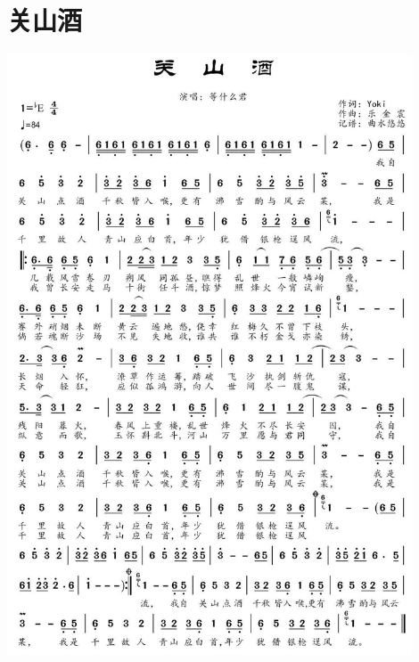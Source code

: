 \documentclass[cn,pad,twocol]{elegantbook}
\begin{document}
\section{关山酒} \includegraphics[width=0.9\textwidth]{macos/2020关山酒.jpg}
\end{document}
